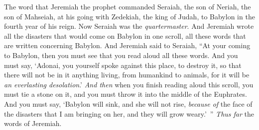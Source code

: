 \begin{biblechapter}
 The word that Jeremiah the prophet commanded Seraiah, the son of Neriah, the son of Mahseiah, at his going with Zedekiah, the king of Judah, to Babylon in the fourth year of his reign. Now Seraiah was the \textit{quartermaster}.
\verse And Jeremiah wrote all the disasters that would come on Babylon in one scroll, all these words that are written concerning Babylon.
\verse And Jeremiah said to Seraiah, “At your coming to Babylon, then you must see that you read aloud all these words.
\verse And you must say, ‘Adonai, you yourself spoke against this place, to destroy it, so that there will not be in it anything living, from humankind to animals, for it will be \textit{an everlasting desolation}.’
\verse \textit{And then} when you finish reading aloud this scroll, you must tie a stone on it, and you must throw it into the middle of the Euphrates.
\verse And you must say, ‘Babylon will sink, and she will not rise, \textit{because of} the face of the disasters that I am bringing on her, and they will grow weary.’ ” \textit{Thus far} the words of Jeremiah.
\end{biblechapter}

